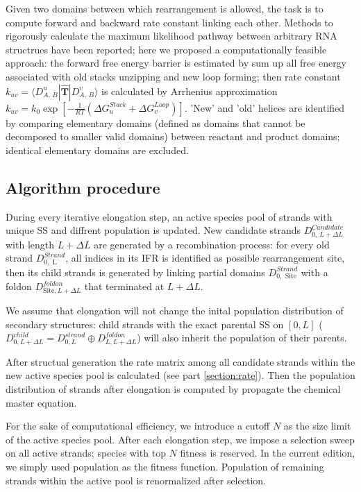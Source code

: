 \documentclass[11pt, a4paper]{article}
\begin{document}
Given two domains between which rearrangement is allowed, the task is to compute forward and backward rate constant
linking each other. Methods to rigorously calculate the maximum likelihood pathway between arbitrary RNA structrues have been reported\cite{Bayegan};
here we proposed a computationally feasible approach: the forward free energy barrier is estimated by sum up all free energy associated
with old stacks unzipping and new loop forming; then rate constant $k_{uv} = \langle D^{u}_{A,\,B} | \hat{\mathbf{T}} | D^{v}_{A,\,B} \rangle $ is calculated by Arrhenius approximation $k_{uv} = k_0 \exp[-\frac{1}{RT}(\Delta G^{Stack}_{u}+\Delta G^{Loop}_{v})]$. 'New' and 'old' helices are identified by comparing elementary domains (defined as domains that cannot be decomposed to smaller valid domains) between reactant and product domains; identical elementary domains are excluded.

\subsection{Algorithm procedure}

During every iterative elongation step, an active species pool of strands with unique SS and diffrent population is updated. New candidate strands $D^{Candidate}_{0,\, L+\Delta L}$ with
length $L+\Delta L$ are generated by a recombination
process: for every old strand $D^{Strand}_{0, \text{ L}}$, all indices in its IFR is identified as possible rearrangement site, then its child strands is generated by linking partial domains
$D^{Strand}_{0, \text{ Site}}$ with a foldon $D^{foldon}_{\text{Site}, L+\Delta L}$ that terminated at $L+\Delta L$.

We assume that elongation will not change the inital population distribution
of secondary structures: child strands with the exact parental SS on $[0, L]$ ($D^{child}_{0, L+\Delta L} = D^{strand}_{0, L} \oplus D^{foldon}_{L, L+\Delta L}$) will also inherit the population of their parents.

After structual generation the rate matrix among all candidate strands within the new active species pool is calculated (see part \ref{section:rate}). Then the population
distribution of strands after elongation is computed by propagate the chemical master equation.

For the sake of computational efficiency, we introduce a cutoff $N $ as the size limit of the active species pool. After each elongation step, we impose a selection sweep on all active
strands; species with top $N $ fitness is reserved. In the current edition, we simply used population as the fitness function. Population of remaining strands within
the active pool is renormalized after selection.
\end{document}
